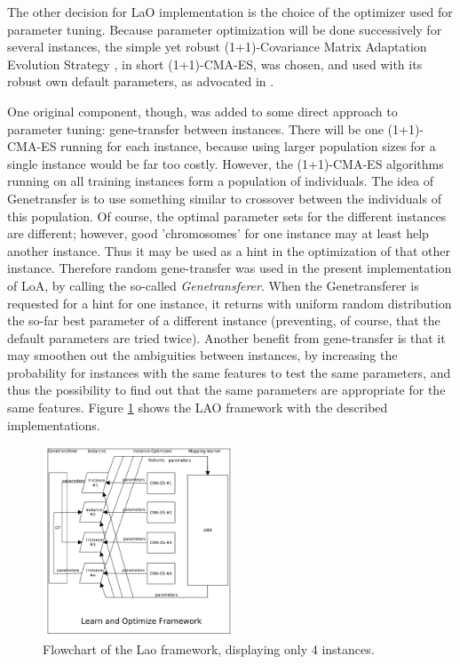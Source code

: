 \documentclass{MYsig-alternate}
\begin{document}
The other decision for LaO implementation is the choice of the optimizer used for parameter tuning. Because parameter optimization will be done successively for several instances, the simple yet robust (1+1)-Covariance Matrix Adaptation Evolution Strategy \cite{hansen2001ecj}, in short (1+1)-CMA-ES,  was chosen, and used with its robust own default parameters, as advocated in \cite{BibGECCO:2010}.

One original component, though, was added to some direct approach to parameter tuning: gene-transfer between instances. There will be one (1+1)-CMA-ES running for each instance, because using larger population sizes for a single instance would be far too costly. However, the (1+1)-CMA-ES algorithms running on all training instances form a population of individuals. The idea of Genetransfer is to use something similar to crossover between the individuals of this population. Of course, the optimal parameter sets for the different instances are different; however, good 'chromosomes' for one instance may at least help another instance. Thus it may be used as a hint in the optimization of that other instance. Therefore random gene-transfer was used in the present implementation of LoA, by calling the so-called {\em Genetransferer}. When the Genetransferer is requested for a hint for one instance, it returns with uniform random distribution the so-far best parameter of a different instance (preventing, of course, that the default parameters are tried twice). Another benefit from gene-transfer is that it may smoothen out the ambiguities between instances, by increasing the probability for instances with the same features to test the same parameters, and thus the possibility to find out that the same parameters are appropriate for the same features. Figure \ref{figure:laoflowchart} shows the LAO framework with the described implementations.

\begin{figure}[h!]
  \centering
    \includegraphics[width=0.5\textwidth]{lao.png}
  \caption{Flowchart of the Lao framework, displaying only 4 instances.}
\label{figure:laoflowchart}
\end{figure}
\end{document}
